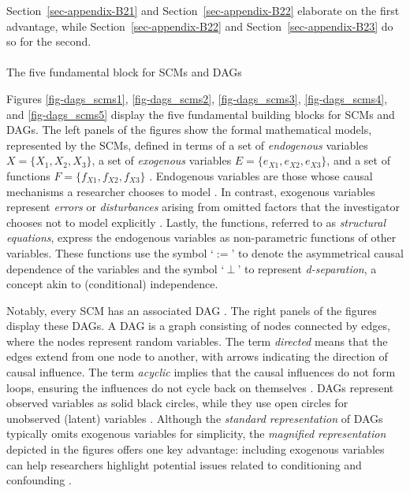 \documentclass[
  authoryear,
  review,
  1p]{elsarticle}
\makeatletter
\let\oldparagraph\paragraph
\renewcommand{\paragraph}{
    \@ifstar
      \xxxParagraphStar
      \xxxParagraphNoStar
  }
\newcommand{\xxxParagraphStar}[1]{\oldparagraph*{#1}\mbox{}}
\newcommand{\xxxParagraphNoStar}[1]{\oldparagraph{#1}\mbox{}}
\makeatother
\begin{document}
Section~\ref{sec-appendix-B21} and Section~\ref{sec-appendix-B22}
elaborate on the first advantage, while Section~\ref{sec-appendix-B22}
and Section~\ref{sec-appendix-B23} do so for the second.

\paragraph{The five fundamental block for SCMs and
DAGs}\label{sec-appendix-B21}

Figures \ref{fig-dags_scms1}, \ref{fig-dags_scms2},
\ref{fig-dags_scms3}, \ref{fig-dags_scms4}, and \ref{fig-dags_scms5}
display the five fundamental building blocks for SCMs and DAGs. The left
panels of the figures show the formal mathematical models, represented
by the SCMs, defined in terms of a set of \emph{endogenous} variables
\(X=\{X_{1},X_{2},X_{3}\}\), a set of \emph{exogenous} variables
\(E=\{e_{X1},e_{X2},e_{X3}\}\), and a set of functions
\(F=\{f_{X1},f_{X2},f_{X3}\}\) \citep{Pearl_2009, Cinelli_et_al_2020}.
Endogenous variables are those whose causal mechanisms a researcher
chooses to model \citep{Neal_2020}. In contrast, exogenous variables
represent \emph{errors} or \emph{disturbances} arising from omitted
factors that the investigator chooses not to model explicitly
\citep[pp.~27,68]{Pearl_2009}. Lastly, the functions, referred to as
\emph{structural equations}, express the endogenous variables as
non-parametric functions of other variables. These functions use the
symbol `\(:=\)' to denote the asymmetrical causal dependence of the
variables and the symbol `\(\:\bot\:\)' to represent
\emph{d-separation}, a concept akin to (conditional) independence.

Notably, every SCM has an associated DAG
\citep{Pearl_et_al_2016, Cinelli_et_al_2020}. The right panels of the
figures display these DAGs. A DAG is a graph consisting of nodes
connected by edges, where the nodes represent random variables. The term
\emph{directed} means that the edges extend from one node to another,
with arrows indicating the direction of causal influence. The term
\emph{acyclic} implies that the causal influences do not form loops,
ensuring the influences do not cycle back on themselves
\citep{McElreath_2020}. DAGs represent observed variables as solid black
circles, while they use open circles for unobserved (latent) variables
\citep{Morgan_et_al_2014}. Although the \emph{standard representation}
of DAGs typically omits exogenous variables for simplicity, the
\emph{magnified representation} depicted in the figures offers one key
advantage: including exogenous variables can help researchers highlight
potential issues related to conditioning and confounding
\citep{Cinelli_et_al_2020}.
\end{document}
